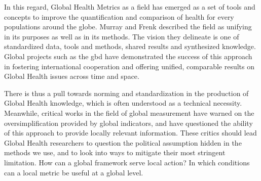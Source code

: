 In this regard, Global Health Metrics as a field has emerged as a set of tools and concepts to improve the quantification and comparison of health for every populations around the globe. Murray and Frenk described the field as unifying in its purposes as well as in its methods\citep{murray_health_2008}. The vision they delineate is one of standardized data, tools and methods, shared results and synthesized knowledge. Global projects such as the \gls{gbd} have demonstrated the success of this approach in fostering international cooperation and offering unified, comparable results on Global Health issues across time and space.



There is thus a pull towards norming and standardization in the production of Global Health knowledge, which is often understood as a technical necessity. Meanwhile, critical works in the field of global measurement have warned on the oversimplification provided by global indicators, and have questioned the ability of this approach to provide locally relevant information\citep{merry_measuring_2011,rottenburg_world_2016}. These critics should lead Global Health researchers to question the political assumption hidden in the methods we use, and to look into ways to mitigate their most stringent limitation. How can a global framework serve local action? In which conditions can a local metric be useful at a global level.

